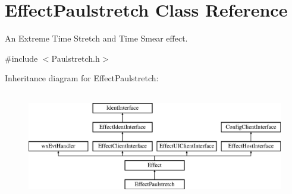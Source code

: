 \hypertarget{class_effect_paulstretch}{}\section{Effect\+Paulstretch Class Reference}
\label{class_effect_paulstretch}


An Extreme Time Stretch and Time Smear effect.  




{\ttfamily \#include $<$Paulstretch.\+h$>$}

Inheritance diagram for Effect\+Paulstretch\+:\begin{figure}[H]
\begin{center}
\leavevmode
\includegraphics[height=4.794520cm]{class_effect_paulstretch}
\end{center}
\end{figure}
